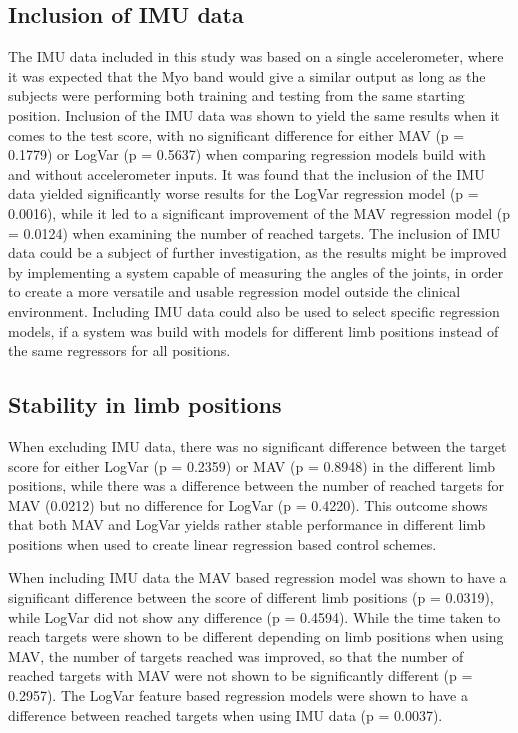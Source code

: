 \subsection{Inclusion of IMU data}
The IMU data included in this study was based on a single accelerometer, where it was expected that the Myo band would give a similar output as long as the subjects were performing both training and testing from the same starting position. Inclusion of the IMU data was shown to yield the same results when it comes to the test score, with no significant difference for either MAV (p = 0.1779) or LogVar (p = 0.5637) when comparing regression models build with and without accelerometer inputs. It was found that the inclusion of the IMU data yielded significantly worse results for the LogVar regression model (p = 0.0016), while it led to a significant improvement of the MAV regression model (p = 0.0124) when examining the number of reached targets. The inclusion of IMU data could be a subject of further investigation, as the results might be improved by implementing a system capable of measuring the angles of the joints, in order to create a more versatile and usable regression model outside the clinical environment. Including IMU data could also be used to select specific regression models, if a system was build with models for different limb positions instead of the same regressors for all positions.

\subsection{Stability in limb positions}
When excluding IMU data, there was no significant difference between the target score for either LogVar (p = 0.2359) or MAV (p = 0.8948) in the different limb positions, while there was a difference between the number of reached targets for MAV (0.0212) but no difference for LogVar (p = 0.4220). This outcome shows that both MAV and LogVar yields rather stable performance in different limb positions when used to create linear regression based control schemes.

When including IMU data the MAV based regression model was shown to have a significant difference between the score of different limb positions (p = 0.0319), while LogVar did not show any difference (p = 0.4594). While the time taken to reach targets were shown to be different depending on limb positions when using MAV, the number of targets reached was improved, so that the number of reached targets with MAV were not shown to be significantly different (p = 0.2957). The LogVar feature based regression models were shown to have a difference between reached targets when using IMU data (p = 0.0037).

